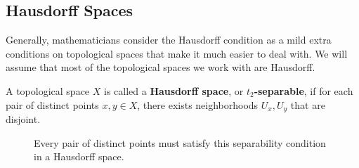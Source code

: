 \subsection{Hausdorff Spaces}

  Generally, mathematicians consider the Hausdorff condition as a mild extra conditions on topological spaces that make it much easier to deal with. We will assume that most of the topological spaces we work with are Hausdorff. 

  \begin{definition}
    A topological space $X$ is called a \textbf{Hausdorff space}, or \textbf{$t_2$-separable}, if for each pair of distinct points $x, y \in X$, there exists neighborhoods $U_x, U_y$ that are disjoint.

    \begin{figure}[H]
      \centering 
      \caption{Every pair of distinct points must satisfy this separability condition in a Hausdorff space.} 
      \label{fig:hausdorff}
    \end{figure}
  \end{definition}

